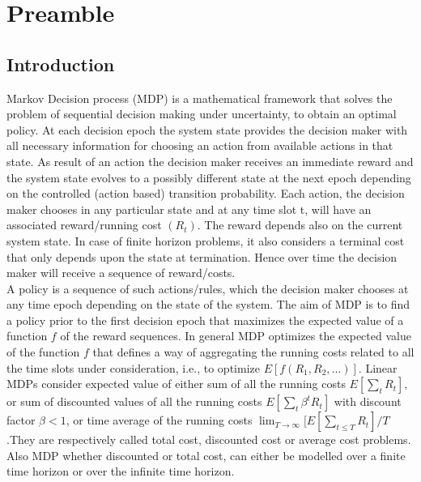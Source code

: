 \documentclass[12pt,a4paper,oneside]{report}
\begin{document}
\chapter{Preamble}
\section{Introduction}
Markov Decision process (MDP) is a mathematical framework that solves the problem of sequential decision making under uncertainty, to obtain an optimal policy. At each decision epoch the system state provides the decision maker with all necessary information for choosing an action from available actions in that state. As result of an action the decision maker receives an immediate reward and the system state evolves to a possibly different state at the next epoch depending on the controlled (action based) transition probability. Each action, the decision maker chooses in any particular state and at any time slot t, will have an associated reward/running cost $(R_t)$. The reward depends also on the current system state. In case of finite horizon problems, it also considers a terminal cost that only depends upon the state at termination. Hence over time the decision maker will receive a sequence of reward/costs.\\

\noindent A policy is a sequence of such actions/rules, which the decision maker chooses at any time epoch depending on the state of the system. The aim of MDP is to find a policy prior to the first decision epoch that maximizes the expected value of a function $f$ of the reward sequences. In general MDP optimizes the expected value of the function $f$ that defines a way of aggregating the running costs related to all the time slots under consideration, i.e., to optimize $E[f(R_1,R_2,...)]$. Linear MDPs consider expected value of either sum of all the running costs $E[\sum_t{R_t} ]$, or sum of discounted values of all the running costs $E[\sum_t{\beta^t {R_t}} ]$ with discount factor $\beta<1$, or time average of the running costs $\lim_{T \to \infty}{[E[ \sum_{t\leq T}{R_t}]}{/T}$ .They are respectively called total cost, discounted cost or average cost problems. Also MDP whether discounted or total cost, can either be modelled over a finite time horizon or over the infinite time horizon. \\
\end{document}
